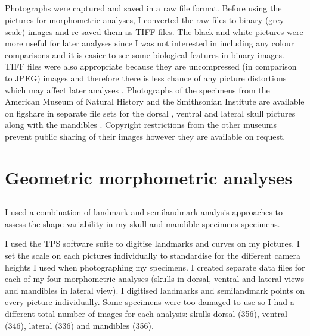 \subsection{}
	Photographs were captured and saved in a raw file format. Before using the pictures for morphometric analyses, I converted the raw files to binary (grey scale) images and re-saved them as TIFF files. The black and white pictures were more useful for later analyses since I was not interested in including any colour comparisons and it is easier to see some biological features in binary images. TIFF files were also appropriate because they are uncompressed (in comparison to JPEG) images and therefore there is less chance of any picture distortions which may affect later analyses \citep{HERC2013}.
	Photographs of the specimens from the American Museum of Natural History and the Smithsonian Institute are available on figshare in separate file sets for the dorsal \citep{Finlay2013d}, ventral \citep{Finlay2013v} and lateral \citep{Finlay2013l} skull pictures along with the mandibles \citep{Finlay2013m}. Copyright restrictions from the other museums prevent public sharing of their images however they are available on request.
	


\section{Geometric morphometric analyses}
\label{sect:morphometrics}

\subsection{}

	I used a combination of landmark and semilandmark analysis approaches to assess the shape variability in my skull and mandible specimens specimens. 

	I used the TPS software suite \citep{Rohlf2013} to digitise landmarks and curves on my pictures. I set the scale on each pictures individually to standardise for the different camera heights I used when photographing my specimens. I created separate data files for each of my four morphometric analyses (skulls in dorsal, ventral and lateral views and mandibles in lateral view). I digitised landmarks and semilandmark points on every picture individually. Some specimens were too damaged to use so I had a different total number of images for each analysis: skulls dorsal (356), ventral (346), lateral (336) and mandibles (356).

